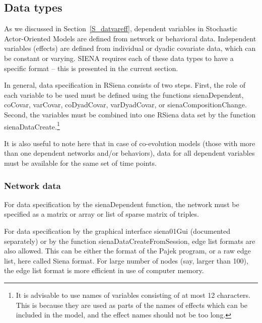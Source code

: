 \documentclass[a4paper,fleqn,11pt]{article}
\newcommand{\+}{\, + \,}
\newcommand{\sfn}[1]{\textsf{#1}}
\newcommand{\RS}{{\sf RSiena }}
\newcommand{\SI}{{\sf SIENA }}
\newcommand{\saom}{{Stochastic Actor-Oriented Model}}
\begin{document}
\subsection{Data types}
\label{S_datatypes}

As we discussed in Section~\ref{S_datvareff}, dependent variables in {\saom}s are defined from
network or behavioral data. Independent variables (effects) are defined
from individual or dyadic covariate data, which can be constant or varying.
\SI requires each of these data types to have a specific format -- this is
presented in the current section.

In general, data specification in \RS consists of two steps.
First, the role of each variable to be used must be defined using
the functions \sfn{sienaDependent}, \sfn{coCovar}, \sfn{varCovar},
\sfn{coDyadCovar}, \sfn{varDyadCovar}, or \sfn{sienaCompositionChange}.
Second, the variables must be combined into one \RS data set by the function
\sfn{sienaDataCreate}.\footnote{It is advisable to use names of variables
consisting of at most 12 characters. This is because they are used as parts
of the names of effects which can be included in the model, and the effect
names should not be too long.}

It is also useful to note here that in case of co-evolution models (those with
more than one dependent networks and/or behaviors), data for all dependent
variables must be available for the same set of time points.


\subsubsection{Network data}

For data specification by the \textsf{sienaDependent} function, the network
must be specified as a matrix or array or list of sparse matrix of triples.

For data specification by the graphical interface \textsf{siena01Gui}
(documented separately)
or by the function \textsf{sienaDataCreateFromSession},
edge list formats are also allowed. This can be either the
format of the Pajek program, or a raw edge list, here called Siena format.
For large number of nodes (say, larger than 100), the edge list
format is more efficient in use of computer memory.
\end{document}
